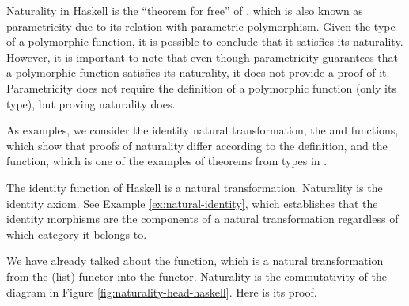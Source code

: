 Naturality in Haskell is the ``theorem for free'' of
\parencite{wadler-1989}, which is also known as parametricity due to
its relation with parametric polymorphism. Given the type of a
polymorphic function, it is possible to conclude that it satisfies its
naturality. However, it is important to note that even though
parametricity guarantees that a polymorphic function satisfies its
naturality, it does not provide a proof of it. Parametricity does not
require the definition of a polymorphic function (only its type), but
proving naturality does.

As examples, we consider the identity natural transformation, the
 and  functions, which show that
proofs of naturality differ according to the definition, and the
 function, which is one of the examples of
theorems from types in \parencite[349]{wadler-1989}.

\begin{example}
  \label{ex:natural-identity-haskell}

  The identity function of Haskell is a natural transformation.
  Naturality is the identity axiom. See Example
  \ref{ex:natural-identity}, which establishes that the identity
  morphisms are the components of a natural transformation regardless
  of which category it belongs to.

\end{example}

\begin{example}
  \label{ex:natural-head-haskell}

  We have already talked about the  function, which
  is a natural transformation from the \texthaskell{[]} (list) functor
  into the  functor. Naturality is the
  commutativity of the diagram in Figure
  \ref{fig:naturality-head-haskell}. Here is its proof.

  \vspace{1em}
  \case{\texthaskell{[]}}
  \begin{steps}
  \end{steps}
  \begin{steps}
  \end{steps}

\end{example}


